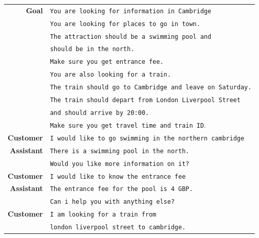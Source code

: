\begin{table}[]
    \centering
    \begin{tabular}{r|l}
    \toprule
        \textbf{Goal} & \texttt{You are looking for information in Cambridge }\\
        & \texttt{You are looking for places to go in town.} \\
        & \texttt{The attraction should be a {\color{cyan!80!yellow!80!black!100 }swimming pool} and } \\
        & \texttt{should be {\color{cyan!80!yellow!80!black!100 }in the north.} }\\
        & \texttt{Make sure you get {\color{orange!50!yellow!90!black!100!}entrance fee.}}\\
        & \texttt{You are also looking for a train.}\\
        & \texttt{The train should go to {\color{cyan!80!yellow!80!black!100 }Cambridge} and {\color{cyan!80!yellow!80!black!100 }leave on Saturday.}}\\
        & \texttt{The train should depart from {\color{cyan!80!yellow!80!black!100 }London Liverpool Street}}\\
        & \texttt{and should {\color{cyan!80!yellow!80!black!100 }arrive by 20:00.}} \\
        & \texttt{Make sure you get {\color{orange!50!yellow!90!black!100!}travel time} and {\color{orange!50!yellow!90!black!100!}train ID}}.\\
        \midrule
        \textbf{Customer} & \texttt{I would like to {\color{cyan!80!yellow!80!black!100 }go swimming} in the {\color{cyan!80!yellow!80!black!100 }northern} cambridge}\\
        \textbf{Assistant} & \texttt{There is a swimming pool in the north.} \\
        & \texttt{Would you like more information on it?} \\
        \textbf{Customer} &\texttt{I would like to know the {\color{orange!50!yellow!90!black!100!}entrance fee}} \\
        \textbf{Assistant} & \texttt{The entrance fee for the pool is {\color{orange!50!yellow!90!black!100!}4 GBP}.} \\
        & \texttt{Can i help you with anything else?}\\
        \textbf{Customer} & \texttt{I am looking for a train from} \\
        & \texttt{{\color{cyan!80!yellow!80!black!100 }london liverpool street} to {\color{cyan!80!yellow!80!black!100 }cambridge}.} \\

\end{tabular}
\end{table}
